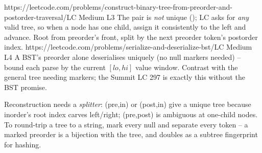 \begin{practiceset}
    {https://leetcode.com/problems/construct-binary-tree-from-preorder-and-postorder-traversal/}{LC Medium L3}
    {The pair is \emph{not} unique (); LC asks for \emph{any} valid tree,
    so when a node has one child, assign it consistently to the left and advance. Root from
    preorder's front, split by the next preorder token's postorder index.}
    {https://leetcode.com/problems/serialize-and-deserialize-bst/}{LC Medium L4}
    {A BST's preorder alone deserialises uniquely (no null markers needed) -- bound each
    parse by the current $[\mathit{lo},\mathit{hi}]$ value window. Contrast with the general
    tree needing markers; the Summit LC 297 is exactly this without the BST promise.}
\end{practiceset}

\begin{recallbox}
Reconstruction needs a \emph{splitter}: (pre,in) or (post,in) give a unique tree because
inorder's root index carves left/right; (pre,post) is ambiguous at one-child nodes. To
round-trip a tree to a string, mark every null and separate every token -- a marked
preorder is a bijection with the tree, and doubles as a subtree fingerprint for hashing.
\end{recallbox}
